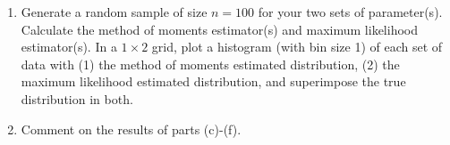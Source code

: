 \documentclass{article}\usepackage[]{graphicx}\usepackage[]{color}
\begin{document}
\begin{enumerate}
\begin{enumerate}
  \item Generate a random sample of size $n=100$ for your two sets of parameter(s).
  Calculate the method of moments estimator(s) and maximum likelihood estimator(s).
  In a $1 \times 2$ grid, plot a histogram (with bin size 1) of each set of data 
  with (1) the method of moments estimated distribution, (2) the maximum likelihood
  estimated distribution, and superimpose the true distribution in both.
  \item Comment on the results of parts (c)-(f). 
\end{enumerate}
\end{enumerate}%
\newpage

\end{document}
